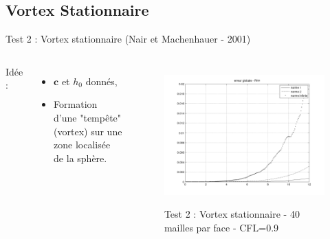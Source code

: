 \documentclass[11pt]{beamer}
\begin{document}
\subsection{Vortex Stationnaire}
\begin{frame}{Test 2 : Vortex stationnaire (Nair et Machenhauer - 2001)}
\begin{columns}
Idée :

\begin{itemize}
\item $\mathbf{c}$ et $h_0$ donnés,

\item Formation d'une "tempête" (vortex) sur une zone localisée de la sphère.
\end{itemize}



\begin{figure}
\href{run:CSapprox_test1.avi}{\includegraphics[scale=0.25]{normerreur_test1_100cfl90.png}} 
\caption{Test 2 : Vortex stationnaire - 40 mailles par face - CFL=0.9}
\end{figure}
\end{columns}
\end{frame}

\end{document}
